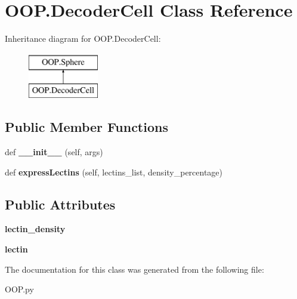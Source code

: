 \hypertarget{class_o_o_p_1_1_decoder_cell}{}\section{O\+O\+P.\+Decoder\+Cell Class Reference}
\label{class_o_o_p_1_1_decoder_cell}
Inheritance diagram for O\+O\+P.\+Decoder\+Cell\+:\begin{figure}[H]
\begin{center}
\leavevmode
\includegraphics[height=2.000000cm]{class_o_o_p_1_1_decoder_cell}
\end{center}
\end{figure}
\subsection*{Public Member Functions}
\begin{DoxyCompactItemize}
\item 
\mbox{\label{class_o_o_p_1_1_decoder_cell_ab882cb87c04aceb28cdaaa7241dbcab7}} 
def {\bfseries \+\_\+\+\_\+init\+\_\+\+\_\+} (self, args)
\item 
\mbox{\label{class_o_o_p_1_1_decoder_cell_a23f2dc9c0c908137e372fe3958cbb6c8}} 
def {\bfseries express\+Lectins} (self, lectins\+\_\+list, density\+\_\+percentage)
\end{DoxyCompactItemize}
\subsection*{Public Attributes}
\begin{DoxyCompactItemize}
\item 
\mbox{\label{class_o_o_p_1_1_decoder_cell_a1f0eef0a92d675b770586dfdf889840c}} 
{\bfseries lectin\+\_\+density}
\item 
\mbox{\label{class_o_o_p_1_1_decoder_cell_a228e5bbfda9a57dadb9e4e13a125a501}} 
{\bfseries lectin}
\end{DoxyCompactItemize}


The documentation for this class was generated from the following file\+:\begin{DoxyCompactItemize}
\item 
O\+O\+P.\+py\end{DoxyCompactItemize}
